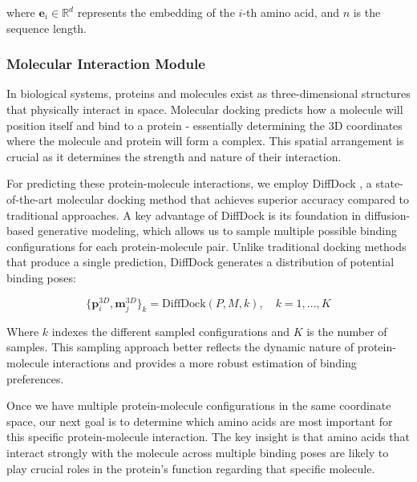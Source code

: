 \documentclass[sigconf]{acmart}
\begin{document}
where $\mathbf{e}_i \in \mathbb{R}^d$ represents the embedding of the $i$-th amino acid, and $n$ is the sequence length.



\subsubsection{Molecular Interaction Module}
\label{sec:mol_interaction}
In biological systems, proteins and molecules exist as three-dimensional structures that physically interact in space. Molecular docking predicts how a molecule will position itself and bind to a protein - essentially determining the 3D coordinates where the molecule and protein will form a complex. This spatial arrangement is crucial as it determines the strength and nature of their interaction.

For predicting these protein-molecule interactions, we employ DiffDock \cite{DiffDock2023}, a state-of-the-art molecular docking method that achieves superior accuracy compared to traditional approaches. A key advantage of DiffDock is its foundation in diffusion-based generative modeling, which allows us to sample multiple possible binding configurations for each protein-molecule pair. Unlike traditional docking methods that produce a single prediction, DiffDock generates a distribution of potential binding poses:

\begin{equation}
    \{\mathbf{p}_i^{3D}, \mathbf{m}_j^{3D}\}_k = \text{DiffDock}(P, M, k), \quad k = 1,...,K
\end{equation}

Where $k$ indexes the different sampled configurations and $K$ is the number of samples. This sampling approach better reflects the dynamic nature of protein-molecule interactions and provides a more robust estimation of binding preferences.

Once we have multiple protein-molecule configurations in the same coordinate space, our next goal is to determine which amino acids are most important for this specific protein-molecule interaction. The key insight is that amino acids that interact strongly with the molecule across multiple binding poses are likely to play crucial roles in the protein's function regarding that specific molecule.
\end{document}
